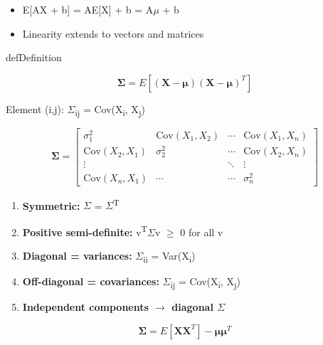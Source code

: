 
\begin{itemize}
\tightlist
\item
  E[AX + b] = AE[X] + b = A\ensuremath{\mu} + b
\item
  Linearity extends to vectors and matrices
\end{itemize}


\begin{PSbox}[unbreakable]{def}{Definition}

\[\boldsymbol{\Sigma} = E[(\mathbf{X} - \boldsymbol{\mu})(\mathbf{X} - \boldsymbol{\mu})^T]\]

Element (i,j): \ensuremath{\Sigma}\textsubscript{ij} = Cov(X\textsubscript{i}, X\textsubscript{j})

\[\boldsymbol{\Sigma} = \begin{bmatrix} \sigma_1^2 & \text{Cov}(X_1,X_2) & \cdots & \text{Cov}(X_1,X_n) \\ \text{Cov}(X_2,X_1) & \sigma_2^2 & \cdots & \text{Cov}(X_2,X_n) \\ \vdots & & \ddots & \vdots \\ \text{Cov}(X_n,X_1) & \cdots & \cdots & \sigma_n^2 \end{bmatrix}\]

\end{PSbox}


\begin{enumerate}
\def\labelenumi{\arabic{enumi}.}
\tightlist
\item
  \textbf{Symmetric:} \ensuremath{\Sigma} = \ensuremath{\Sigma}\textsuperscript{T}
\item
  \textbf{Positive semi-definite:} v\textsuperscript{T}\ensuremath{\Sigma}v \ensuremath{\ge} 0 for all v
\item
  \textbf{Diagonal = variances:} \ensuremath{\Sigma}\textsubscript{ii} = Var(X\textsubscript{i})
\item
  \textbf{Off-diagonal = covariances:} \ensuremath{\Sigma}\textsubscript{ij} = Cov(X\textsubscript{i}, X\textsubscript{j})
\item
  \textbf{Independent components \ensuremath{\to} diagonal \ensuremath{\Sigma}}
\end{enumerate}


\[\boldsymbol{\Sigma} = E[\mathbf{X}\mathbf{X}^T] - \boldsymbol{\mu}\boldsymbol{\mu}^T\]

